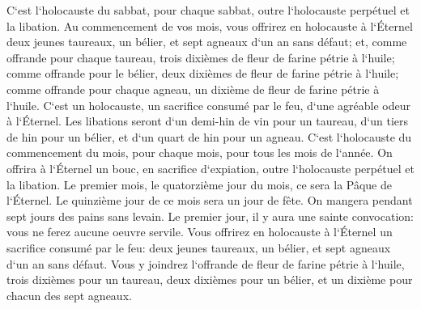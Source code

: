 \verse C`est l`holocauste du sabbat, pour chaque sabbat, outre l`holocauste perpétuel et la libation. 
\verse Au commencement de vos mois, vous offrirez en holocauste à l`Éternel deux jeunes taureaux, un bélier, et sept agneaux d`un an sans défaut; 
\verse et, comme offrande pour chaque taureau, trois dixièmes de fleur de farine pétrie à l`huile; comme offrande pour le bélier, deux dixièmes de fleur de farine pétrie à l`huile; 
\verse comme offrande pour chaque agneau, un dixième de fleur de farine pétrie à l`huile. C`est un holocauste, un sacrifice consumé par le feu, d`une agréable odeur à l`Éternel. 
\verse Les libations seront d`un demi-hin de vin pour un taureau, d`un tiers de hin pour un bélier, et d`un quart de hin pour un agneau. C`est l`holocauste du commencement du mois, pour chaque mois, pour tous les mois de l`année. 
\verse On offrira à l`Éternel un bouc, en sacrifice d`expiation, outre l`holocauste perpétuel et la libation. 
\verse Le premier mois, le quatorzième jour du mois, ce sera la Pâque de l`Éternel. 
\verse Le quinzième jour de ce mois sera un jour de fête. On mangera pendant sept jours des pains sans levain. 
\verse Le premier jour, il y aura une sainte convocation: vous ne ferez aucune oeuvre servile. 
\verse Vous offrirez en holocauste à l`Éternel un sacrifice consumé par le feu: deux jeunes taureaux, un bélier, et sept agneaux d`un an sans défaut. 
\verse Vous y joindrez l`offrande de fleur de farine pétrie à l`huile, trois dixièmes pour un taureau, deux dixièmes pour un bélier, 
\verse et un dixième pour chacun des sept agneaux. 
